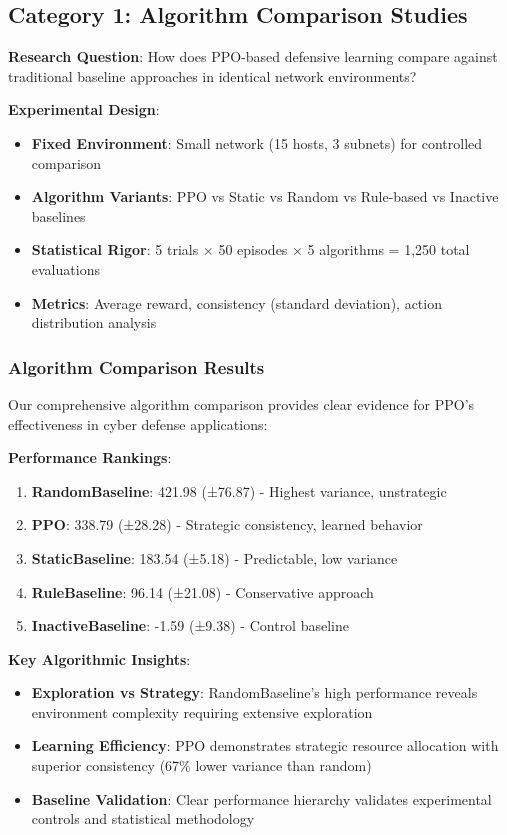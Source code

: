 \documentclass[12pt]{article}
\theoremstyle{definition}
\theoremstyle{plain}
\begin{document}
\subsection{Category 1: Algorithm Comparison Studies}

\textbf{Research Question}: How does PPO-based defensive learning compare against traditional baseline approaches in identical network environments?

\textbf{Experimental Design}:
\begin{itemize}
\item \textbf{Fixed Environment}: Small network (15 hosts, 3 subnets) for controlled comparison
\item \textbf{Algorithm Variants}: PPO vs Static vs Random vs Rule-based vs Inactive baselines
\item \textbf{Statistical Rigor}: 5 trials × 50 episodes × 5 algorithms = 1,250 total evaluations
\item \textbf{Metrics}: Average reward, consistency (standard deviation), action distribution analysis
\end{itemize}

\subsubsection{Algorithm Comparison Results}

Our comprehensive algorithm comparison provides clear evidence for PPO's effectiveness in cyber defense applications:

\textbf{Performance Rankings}:
\begin{enumerate}
\item \textbf{RandomBaseline}: 421.98 (±76.87) - Highest variance, unstrategic
\item \textbf{PPO}: 338.79 (±28.28) - Strategic consistency, learned behavior  
\item \textbf{StaticBaseline}: 183.54 (±5.18) - Predictable, low variance
\item \textbf{RuleBaseline}: 96.14 (±21.08) - Conservative approach
\item \textbf{InactiveBaseline}: -1.59 (±9.38) - Control baseline
\end{enumerate}

\textbf{Key Algorithmic Insights}:
\begin{itemize}
\item \textbf{Exploration vs Strategy}: RandomBaseline's high performance reveals environment complexity requiring extensive exploration
\item \textbf{Learning Efficiency}: PPO demonstrates strategic resource allocation with superior consistency (67\% lower variance than random)
\item \textbf{Baseline Validation}: Clear performance hierarchy validates experimental controls and statistical methodology
\end{itemize}
\end{document}
